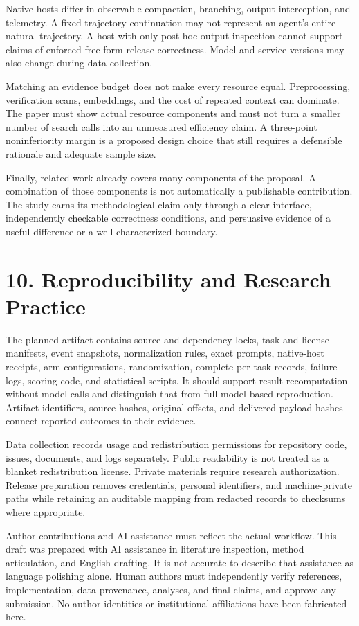 \documentclass[
  11pt,
  a4paper,
]{article}
\begin{document}
Native hosts differ in observable compaction, branching, output
interception, and telemetry. A fixed-trajectory continuation may not
represent an agent's entire natural trajectory. A host with only
post-hoc output inspection cannot support claims of enforced free-form
release correctness. Model and service versions may also change during
data collection.

Matching an evidence budget does not make every resource equal.
Preprocessing, verification scans, embeddings, and the cost of repeated
context can dominate. The paper must show actual resource components and
must not turn a smaller number of search calls into an unmeasured
efficiency claim. A three-point noninferiority margin is a proposed
design choice that still requires a defensible rationale and adequate
sample size.

Finally, related work already covers many components of the proposal. A
combination of those components is not automatically a publishable
contribution. The study earns its methodological claim only through a
clear interface, independently checkable correctness conditions, and
persuasive evidence of a useful difference or a well-characterized
boundary.

\section{10. Reproducibility and Research
Practice}\label{reproducibility-and-research-practice}

The planned artifact contains source and dependency locks, task and
license manifests, event snapshots, normalization rules, exact prompts,
native-host receipts, arm configurations, randomization, complete
per-task records, failure logs, scoring code, and statistical scripts.
It should support result recomputation without model calls and
distinguish that from full model-based reproduction. Artifact
identifiers, source hashes, original offsets, and delivered-payload
hashes connect reported outcomes to their evidence.

Data collection records usage and redistribution permissions for
repository code, issues, documents, and logs separately. Public
readability is not treated as a blanket redistribution license. Private
materials require research authorization. Release preparation removes
credentials, personal identifiers, and machine-private paths while
retaining an auditable mapping from redacted records to checksums where
appropriate.

Author contributions and AI assistance must reflect the actual workflow.
This draft was prepared with AI assistance in literature inspection,
method articulation, and English drafting. It is not accurate to
describe that assistance as language polishing alone. Human authors must
independently verify references, implementation, data provenance,
analyses, and final claims, and approve any submission. No author
identities or institutional affiliations have been fabricated here.
\end{document}
